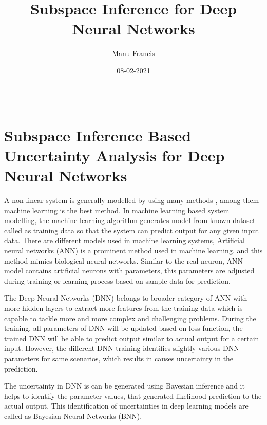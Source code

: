 \documentclass[12pt,a4paper]{article}
\title{ Subspace Inference for Deep Neural Networks }
\author{ Manu Francis }
\date{ 08-02-2021 }
\begin{document}
\maketitle

\rule{\textwidth}{1pt}
\section{Subspace Inference Based Uncertainty Analysis for Deep Neural Networks}
A non-linear system is generally modelled by using many methods , among them machine learning is the best method. In machine learning based system modelling, the machine learning algorithm generates model from known dataset called  as training data so that the system can predict output for any given input data. There are different models used in machine learning systems, Artificial neural networks (ANN) is a prominent method used in machine learning. and this method mimics biological neural networks. Similar to the real neuron, ANN model contains artificial neurons with parameters, this parameters are adjusted during training or learning process based on sample data for prediction.

The Deep Neural Networks (DNN)  belongs to broader category of ANN with more hidden layers to extract more features from the training data which is capable to tackle more and more complex and challenging problems. During the  training, all parameters of DNN will be updated based on loss function, the trained DNN will be able to predict output similar to actual output for a certain input. However, the different DNN  training identifies slightly various DNN parameters for same scenarios, which results in causes uncertainty in the prediction.

The uncertainty in DNN is can be generated using Bayesian inference and it helps to identify the parameter values, that generated likelihood prediction to the actual output.  This identification of uncertainties in deep learning models are called as Bayesian Neural Networks (BNN).
\end{document}
